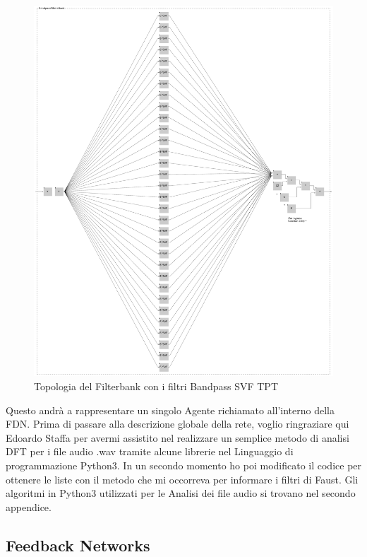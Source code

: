 \clearpage
\begin{figure}[h!]
\begin{center}
    \includegraphics[width=15cm]{figures/BPFilterBank.pdf}
    \caption{Topologia del Filterbank con i filtri Bandpass SVF TPT}
\end{center}
\vspace{0.5cm}
\end{figure}

Questo andrà a rappresentare un singolo Agente richiamato all'interno della FDN.
Prima di passare alla descrizione globale della rete,
voglio ringraziare qui Edoardo Staffa per avermi assistito 
nel realizzare un semplice metodo di analisi DFT per i file audio .wav 
tramite alcune librerie nel Linguaggio di programmazione Python3.
In un secondo momento ho poi modificato il codice per 
ottenere le liste con il metodo che mi occorreva per informare i filtri di Faust.
Gli algoritmi in Python3 utilizzati per le Analisi dei file audio si trovano nel
secondo appendice.

\subsection{Feedback Networks}
\label{Feedback Networks}

